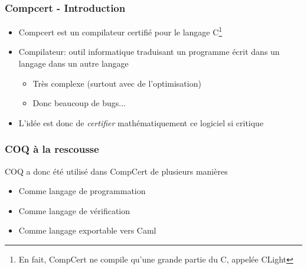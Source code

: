 \documentclass[11pt,a4paper]{beamer}
\theoremstyle{plain}
\theoremstyle{definition}
\theoremstyle{remark}
\begin{document}
\begin{frame}
\frametitle{Compcert - Introduction}
\begin{itemize}
\item Compcert est un compilateur certifié pour le langage C\footnote{En fait, CompCert ne compile qu'une grande partie du C, appelée CLight}
\item Compilateur: outil informatique traduisant un programme écrit dans un langage dans un autre langage
\begin{itemize}
	\item Très complexe (surtout avec de l'optimisation)
	\item Donc beaucoup de bugs...
\end{itemize}
\item L'idée est donc de \emph{certifier} mathématiquement ce logiciel si critique
\end{itemize}
\end{frame}

\begin{frame}
\frametitle{COQ à la rescousse}
COQ a donc été utilisé dans CompCert de plusieurs manières
\begin{itemize}
	\item Comme langage de programmation
	\item Comme langage de vérification
	\item Comme langage exportable vers Caml
\end{itemize}
\end{frame}
\end{document}
